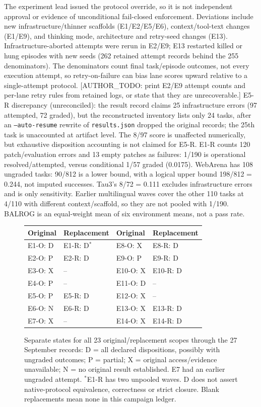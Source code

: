 \documentclass[a4paper,runningheads]{llncs}
\begin{document}
The experiment lead issued the protocol override, so it is not independent
approval or evidence of unconditional fail-closed enforcement. Deviations
include new infrastructure/thinner scaffolds (E1/E2/E5/E6), context/tool-text
changes (E1/E9), and thinking mode, architecture and retry-seed changes (E13).
Infrastructure-aborted attempts were rerun in E2/E9; E13 restarted killed or
hung episodes with new seeds (262 retained attempt records behind the 255
denominators). The denominators count final task/episode
outcomes, not every execution attempt, so retry-on-failure can bias lane
scores upward relative to a single-attempt protocol.
[AUTHOR\_TODO: print E2/E9 attempt counts and per-lane retry rules from
retained logs, or state that they are unrecoverable.]
E5-R discrepancy (unreconciled): the result record claims 25
infrastructure errors (97 attempted, 72 graded), but the reconstructed
inventory lists only 24 tasks, after an \texttt{--auto-resume} rewrite of
\texttt{results.json} dropped the original records; the 25th task is
unaccounted at artifact level. The 8/97 score is unaffected numerically,
but exhaustive disposition accounting is not claimed for E5-R. E1-R counts 120 patch/evaluation errors
and 13 empty patches as failures: 1/190 is operational resolved/attempted,
versus conditional 1/57 graded (0.0175). WebArena has 108 ungraded tasks: 90/812 is a lower bound,
with a logical upper bound 198/812 = 0.244, not imputed successes. Tau3's
8/72 = 0.111 excludes infrastructure errors and is only sensitivity.
Earlier multilingual waves cover the other 110 tasks at 4/110 with different
context/scaffold, so they are not pooled with 1/190. BALROG is an equal-weight
mean of six environment means, not a pass rate.

\begin{figure}[t]\centering\small
\begin{tabular}{@{}l@{\quad}l@{\qquad}l@{\quad}l@{}}\toprule
Original & Replacement & Original & Replacement \\\midrule
E1-O: D & E1-R: D$^*$ & E8-O: X & E8-R: D \\
E2-O: P & E2-R: D & E9-O: P & E9-R: D \\
E3-O: X & -- & E10-O: X & E10-R: D \\
E4-O: P & -- & E11-O: D & -- \\
E5-O: P & E5-R: D & E12-O: X & -- \\
E6-O: N & E6-R: D & E13-O: X & E13-R: D \\
E7-O: X & -- & E14-O: X & E14-R: D \\\bottomrule
\end{tabular}
\caption{Separate states for all 23 original/replacement scopes through the
27 September records: D = all declared dispositions, possibly with ungraded
outcomes; P = partial; X = original access/evidence unavailable; N = no original
result established. E7 had an earlier ungraded attempt. $^*$E1-R has two
unpooled waves. D does not assert native-protocol equivalence, correctness or
strict closure. Blank replacements mean none in this campaign ledger.}
\label{fig:states}
\end{figure}
\end{document}

